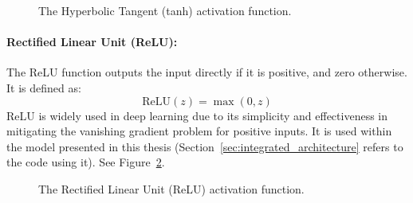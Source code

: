 \begin{figure}[htbp]
  \centering
  \caption{The Hyperbolic Tangent (tanh) activation function.}
  \label{fig:tanh_plot}
\end{figure}


\paragraph{Rectified Linear Unit (ReLU):}
The ReLU function outputs the input directly if it is positive, and zero otherwise. It is defined as:
\begin{equation}
  \text{ReLU}(z) = \max(0, z)
\end{equation}
ReLU is widely used in deep learning due to its simplicity and effectiveness in mitigating the vanishing gradient problem for positive inputs. It is used within the model presented in this thesis (Section~\ref{sec:integrated_architecture} refers to the code using it). See Figure~\ref{fig:relu_plot}.

\begin{figure}[htbp]
  \centering
  \caption{The Rectified Linear Unit (ReLU) activation function.}
  \label{fig:relu_plot}
\end{figure}


